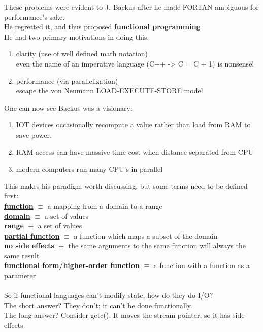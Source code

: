 \documentclass[../../lecture_notes.tex]{subfiles}
\begin{document}
These problems were evident to J. Backus after he made FORTAN ambiguous for performance's sake.\\
He regretted it, and thus proposed \textbf{\underline{functional programming}}\\
He had two primary motivations in doing this: \begin{enumerate}[itemsep=0mm]
	\item clarity (use of well defined math notation)\\
		even the name of an imperative language (C++ -> C = C + 1) is nonsense!
	\item performance (via parallelization)\\
		escape the von Neumann LOAD-EXECUTE-STORE model
	\end{enumerate}

\noindent One can now see Backus was a visionary: \begin{enumerate}[itemsep=0mm]
	\item IOT devices occasionally recompute a value rather than load from RAM to save power.
	\item RAM access can have massive time cost when distance separated from CPU
	\item modern computers run many CPU's in parallel
	\end{enumerate}
This makes his paradigm worth discussing, but some terms need to be defined first:\\
	\indent \textbf{\underline{function}} $\equiv$ a mapping from a domain to a range\\
	\indent \textbf{\underline{domain}} $\equiv$ a set of values\\
	\indent \textbf{\underline{range}} $\equiv$ a set of values\\
	\indent \textbf{\underline{partial function}} $\equiv$ a function which maps a subset of the domain\\
	\indent \textbf{\underline{no side effects}} $\equiv$ 
		the same arguments to the same function will always the same result\\
	\indent \textbf{\underline{functional form/higher-order function}} $\equiv$
		a function with a function as a parameter\\
\\
So if functional languages can't modify state, how do they do I/O?\\
	\indent The short answer? They don't; it can't be done functionally. \\
	\indent The long answer? Consider getc().  It moves the stream pointer, so it has side effects.\\
\end{document}
